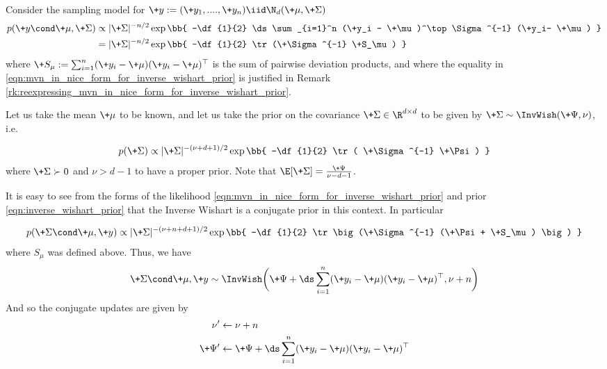 \documentclass{article} %
\begin{document}
\begin{example}{} \label{ex:inverse_wishart_prior}



Consider the sampling model for $\+y :=(\+y_1, ....,\+y_n) \iid \N_d(\+\mu,  \+\Sigma)$
\begin{align}
p(\+y \cond \+\mu, \+\Sigma) & \propto | \+\Sigma |^{-n/2} \exp \bb{ -\df{1}{2} \ds\sum_{i=1}^n (\+y_i - \+\mu)^\top  \Sigma^{-1} (\+y_i- \+\mu) } \nonumber \\
& = | \+\Sigma |^{-n/2} \exp \bb{ -\df{1}{2} \tr(\+\Sigma^{-1} \+S_\mu)  }\label{eqn:mvn_in_nice_form_for_inverse_wishart_prior}
\end{align}
where $\+S_\mu := \sum_{i=1}^n (\+y_i - \+\mu) (\+y_i - \+\mu)^\top$ is the sum of pairwise deviation products,  and where the equality in \eqref{eqn:mvn_in_nice_form_for_inverse_wishart_prior}  is justified in Remark \ref{rk:reexpressing_mvn_in_nice_form_for_inverse_wishart_prior}.

Let us take the mean $\+\mu$ to be known,  and let us take the prior on the covariance $\+\Sigma \in \R^{d \times d}$ to be given by $\+\Sigma \sim \InvWish(\+\Psi, \nu)$, i.e.

\begin{align}
p(\+\Sigma) \propto | \+\Sigma|^{-(\nu+d +1) /2}  \exp \bb{ -\df{1}{2} \tr ( \+\Sigma^{-1} \+\Psi) } 
\label{eqn:inverse_wishart_prior}
\end{align}
where $\+\Sigma \succ 0$ and $\nu > d-1$ to have a proper prior.   Note that $\E[\+\Sigma] = \frac{\+\Psi}{\nu -d -1}$.

It is easy to see from the forms of the likelihood \eqref{eqn:mvn_in_nice_form_for_inverse_wishart_prior} and prior \eqref{eqn:inverse_wishart_prior} that the Inverse Wishart is a conjugate prior in this context.  In particular

\begin{align}
p(\+\Sigma \cond \+\mu,  \+y) \propto | \+\Sigma|^{-(\nu+ n + d +1) /2}  \exp \bb{ -\df{1}{2} \tr \big(\+\Sigma^{-1} (\+\Psi + \+S_\mu) \big) } 
\label{eqn:inverse_wishart_posterior}
\end{align}
where $S_\mu$ was defined above.  Thus,  we have 
\[ \+\Sigma \cond \+\mu,  \+y \sim \InvWish \bigg( \+\Psi +  \ds\sum_{i=1}^n (\+y_i - \+\mu) (\+y_i - \+\mu)^\top,  \nu + n \bigg) \]
And so the conjugate updates are given by
\begin{align}
\nu^\prime &\leftarrow  \nu + n \\
\+\Psi^\prime &\leftarrow \+\Psi + \ds\sum_{i=1}^n (\+y_i - \+\mu) (\+y_i - \+\mu)^\top
\end{align}
\end{example}
\end{document}

